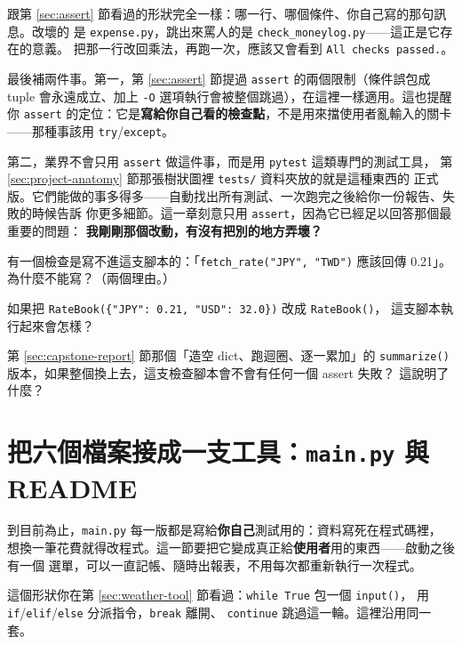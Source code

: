 跟第 \ref{sec:assert} 節看過的形狀完全一樣：哪一行、哪個條件、你自己寫的那句訊息。改壞的
是 \texttt{expense.py}，跳出來罵人的是 \texttt{check\_moneylog.py}——這正是它存在的意義。
把那一行改回乘法，再跑一次，應該又會看到 \texttt{All checks passed.}。

最後補兩件事。第一，第 \ref{sec:assert} 節提過 \texttt{assert} 的兩個限制（條件誤包成
tuple 會永遠成立、加上 \texttt{-O} 選項執行會被整個跳過），在這裡一樣適用。這也提醒你
\texttt{assert} 的定位：它是\textbf{寫給你自己看的檢查點}，不是用來擋使用者亂輸入的關卡
——那種事該用 \texttt{try}/\texttt{except}。

第二，業界不會只用 \texttt{assert} 做這件事，而是用 \texttt{pytest} 這類專門的測試工具，
第 \ref{sec:project-anatomy} 節那張樹狀圖裡 \texttt{tests/} 資料夾放的就是這種東西的
正式版。它們能做的事多得多——自動找出所有測試、一次跑完之後給你一份報告、失敗的時候告訴
你更多細節。這一章刻意只用 \texttt{assert}，因為它已經足以回答那個最重要的問題：\textbf{
我剛剛那個改動，有沒有把別的地方弄壞？}

\begin{drills}[label=drills:capstone-tests]
\item 有一個檢查是寫不進這支腳本的：「\texttt{fetch\_rate("JPY", "TWD")} 應該回傳
0.21」。為什麼不能寫？（兩個理由。）
\item 如果把 \texttt{RateBook(\{"JPY": 0.21, "USD": 32.0\})} 改成 \texttt{RateBook()}，
這支腳本執行起來會怎樣？
\item 第 \ref{sec:capstone-report} 節那個「造空 dict、跑迴圈、逐一累加」的
\texttt{summarize()} 版本，如果整個換上去，這支檢查腳本會不會有任何一個 assert 失敗？
這說明了什麼？
\end{drills}

\section{把六個檔案接成一支工具：\texttt{main.py} 與 README}
\label{sec:capstone-wiring}

到目前為止，\texttt{main.py} 每一版都是寫給\textbf{你自己}測試用的：資料寫死在程式碼裡，
想換一筆花費就得改程式。這一節要把它變成真正給\textbf{使用者}用的東西——啟動之後有一個
選單，可以一直記帳、隨時出報表，不用每次都重新執行一次程式。

這個形狀你在第 \ref{sec:weather-tool} 節看過：\texttt{while True} 包一個 \texttt{input()}，
用 \texttt{if}/\texttt{elif}/\texttt{else} 分派指令，\texttt{break} 離開、
\texttt{continue} 跳過這一輪。這裡沿用同一套。

